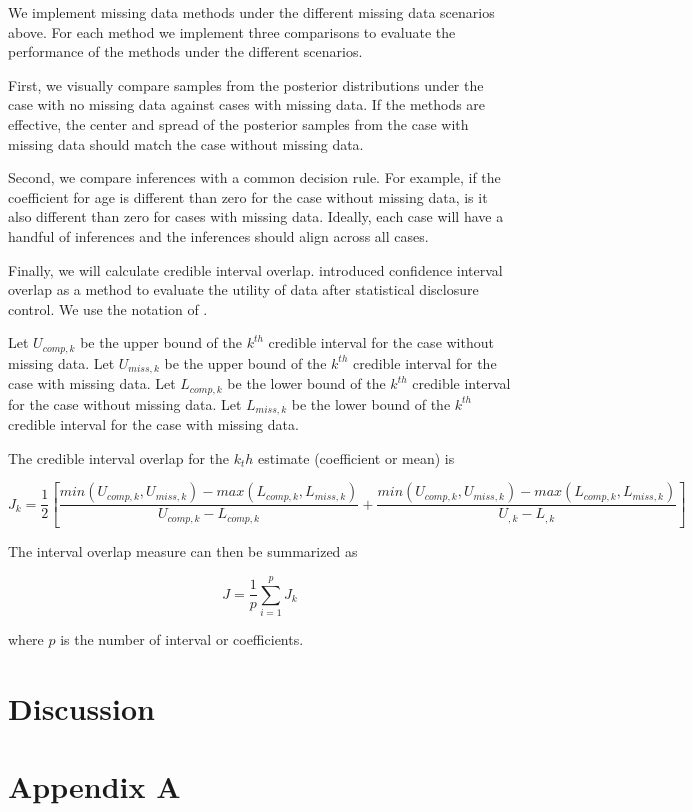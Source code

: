 \documentclass[11pt]{article}
\begin{document}
We implement missing data methods under the different missing data scenarios above. For each method we implement three comparisons to evaluate the performance of the methods under the different scenarios. 

First, we visually compare samples from the posterior distributions under the case with no missing data against cases with missing data. If the methods are effective, the center and spread of the posterior samples from the case with missing data should match the case without missing data. 

Second, we compare inferences with a common decision rule. For example, if the coefficient for age is different than zero for the case without missing data, is it also different than zero for cases with missing data. Ideally, each case will have a handful of inferences and the inferences should align across all cases. 

Finally, we will calculate credible interval overlap. \cite{Karr2006} introduced confidence interval overlap as a method to evaluate the utility of data after statistical disclosure control. We use the notation of \cite{Snoke2018}.

Let $U_{comp,k}$ be the upper bound of the $k^{th}$ credible interval for the case without missing data. Let $U_{miss,k}$ be the upper bound of the $k^{th}$ credible interval for the case with missing data. Let $L_{comp,k}$ be the lower bound of the $k^{th}$ credible interval for the case without missing data. Let $L_{miss,k}$ be the lower bound of the $k^{th}$ credible interval for the case with missing data. 

The credible interval overlap for the $k_th$ estimate (coefficient or mean) is 

$$J_k = \frac{1}{2}\left[\frac{min(U_{comp,k}, U_{miss,k}) - max(L_{comp,k}, L_{miss,k})}{U_{comp,k} - L_{comp,k}} + \frac{min(U_{comp,k}, U_{miss,k}) - max(L_{comp,k}, L_{miss,k})}{U_{,k} - L_{,k}}\right]$$

The interval overlap measure can then be summarized as 

$$J = \frac{1}{p}\sum_{i = 1}^pJ_k$$

where $p$ is the number of interval or coefficients. 

\section{Discussion}

\newpage
\section{Appendix A}
\end{document}
